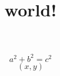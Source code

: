 \documentclass{article}
\begin{document}
\title{world!}

\[a^2 +b^2 = c^2\]
\[(x,y )\]
\end{document}
